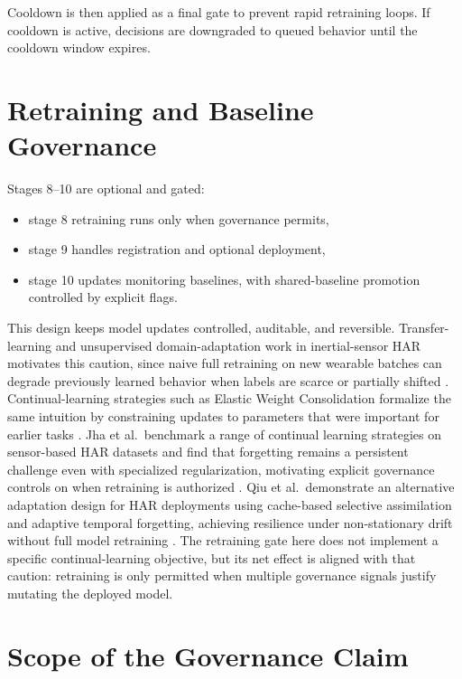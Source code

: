 Cooldown is then applied as a final gate to prevent rapid retraining loops. If cooldown is active, decisions are downgraded to queued behavior until the cooldown window expires.

\section{Retraining and Baseline Governance}

Stages 8--10 are optional and gated:

\begin{itemize}
	\item stage 8 retraining runs only when governance permits,
	\item stage 9 handles registration and optional deployment,
	\item stage 10 updates monitoring baselines, with shared-baseline promotion controlled by explicit flags.
\end{itemize}

This design keeps model updates controlled, auditable, and reversible. Transfer-learning and unsupervised domain-adaptation work in inertial-sensor HAR motivates this caution, since naive full retraining on new wearable batches can degrade previously learned behavior when labels are scarce or partially shifted \cite{dhekane2024transfer,chakma2023imuda,akbari2019transfer}. Continual-learning strategies such as Elastic Weight Consolidation formalize the same intuition by constraining updates to parameters that were important for earlier tasks \cite{kirkpatrick2017ewc}. Jha et al.\ benchmark a range of continual learning strategies on sensor-based HAR datasets and find that forgetting remains a persistent challenge even with specialized regularization, motivating explicit governance controls on when retraining is authorized \cite{jha2021continual}. Qiu et al.\ demonstrate an alternative adaptation design for HAR deployments using cache-based selective assimilation and adaptive temporal forgetting, achieving resilience under non-stationary drift without full model retraining \cite{qiu2024coda}. The retraining gate here does not implement a specific continual-learning objective, but its net effect is aligned with that caution: retraining is only permitted when multiple governance signals justify mutating the deployed model.

\section{Scope of the Governance Claim}


